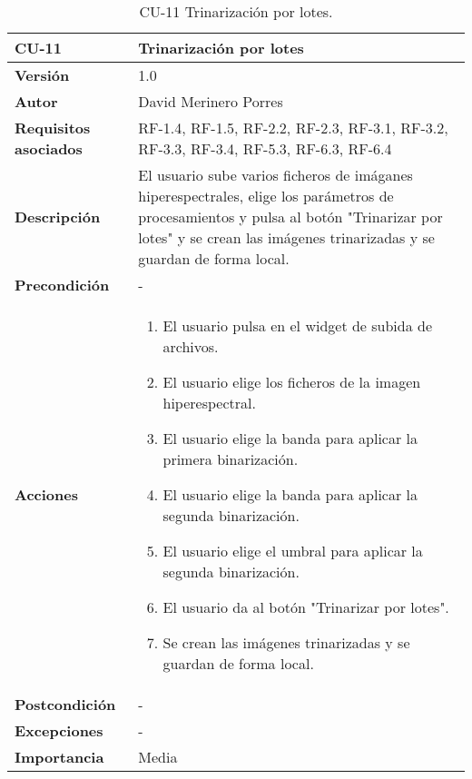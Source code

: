 \begin{table}[p]
	\centering
	\begin{tabularx}{\linewidth}{ p{} p{} }
		\toprule
		\textbf{CU-11}    & \textbf{Trinarización por lotes}\\
		\toprule
		\textbf{Versión}              & 1.0    \\
		\textbf{Autor}                & David Merinero Porres \\
		\textbf{Requisitos asociados} & RF-1.4, RF-1.5, RF-2.2, RF-2.3, RF-3.1, RF-3.2, RF-3.3, RF-3.4, RF-5.3, RF-6.3, RF-6.4 \\
		\textbf{Descripción}          & El usuario sube varios ficheros de imáganes hiperespectrales, elige los parámetros de procesamientos y pulsa al botón "Trinarizar por lotes" y se crean las imágenes trinarizadas y se guardan de forma local. \\
		\textbf{Precondición}         & - \\
		\textbf{Acciones}             &
		\begin{enumerate}
			\def\labelenumi{\arabic{enumi}.}
			\tightlist
   			\item El usuario pulsa en el widget de subida de archivos.
			\item El usuario elige los ficheros de la imagen hiperespectral.
			\item El usuario elige la banda para aplicar la primera binarización.
                \item El usuario elige la banda para aplicar la segunda binarización.
                \item El usuario elige el umbral para aplicar la segunda binarización.
                \item El usuario da al botón "Trinarizar por lotes".
                \item Se crean las imágenes trinarizadas y se guardan de forma local.
		\end{enumerate}\\
		\textbf{Postcondición}        & - \\
		\textbf{Excepciones}          & - \\
		\textbf{Importancia}          & Media \\
		\bottomrule
	\end{tabularx}
	\caption{CU-11 Trinarización por lotes.}
\end{table}